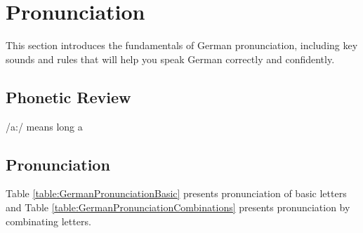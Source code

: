 \section{Pronunciation}\label{sec:pronunciation}

This section introduces the fundamentals of German pronunciation, including key sounds and rules that will help you speak German correctly and confidently.

\subsection{Phonetic Review}

/a:/ means long a

\subsection{Pronunciation}

Table \ref{table:GermanPronunciationBasic} presents pronunciation of basic letters and Table \ref{table:GermanPronunciationCombinations} presents pronunciation by combinating letters.

